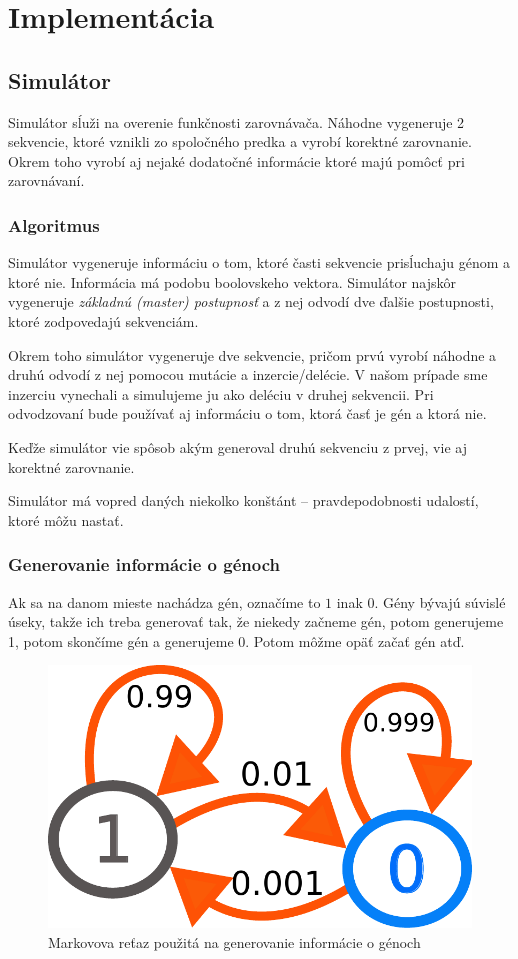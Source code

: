 \chapter{Implementácia}

\section{Simulátor}

Simulátor sĺuži na overenie funkčnosti zarovnávača. Náhodne vygeneruje 2 sekvencie, ktoré vznikli zo spoločného predka a vyrobí korektné zarovnanie. Okrem toho vyrobí aj nejaké dodatočné informácie ktoré majú pomôcť pri zarovnávaní.

\subsection{Algoritmus}
Simulátor vygeneruje informáciu o tom, ktoré časti sekvencie prisĺuchaju génom a ktoré nie. Informácia má podobu boolovskeho vektora.
Simulátor najskôr vygeneruje \textit{základnú (master) postupnosť} a z nej odvodí dve ďalšie postupnosti, ktoré zodpovedajú sekvenciám.

Okrem toho simulátor vygeneruje dve sekvencie, pričom prvú vyrobí náhodne a druhú odvodí z nej pomocou mutácie a inzercie/delécie.
V našom prípade sme inzerciu vynechali a simulujeme ju ako deléciu v druhej sekvencii.
Pri odvodzovaní bude používať aj informáciu o tom, ktorá časť je gén a ktorá nie.

Keďže simulátor vie spôsob akým generoval druhú sekvenciu z prvej, vie aj korektné zarovnanie.

Simulátor má vopred daných niekolko konštánt -- pravdepodobnosti udalostí, ktoré môžu nastať.

\subsection{Generovanie informácie o génoch}
Ak sa na danom mieste nachádza gén, označíme to $1$ inak $0$.
Gény bývajú súvislé úseky, takže ich treba generovať tak, že niekedy začneme gén, potom generujeme 1, potom skončíme gén a generujeme 0. Potom môžme opäť začať gén atď.

\begin{figure}[htp]
    \centering
    \includegraphics[width=.3\textwidth]{images/markov_chain}
    \caption{Markovova reťaz použitá na generovanie informácie o génoch}
    \label{fig:markov_chain}
\end{figure}

